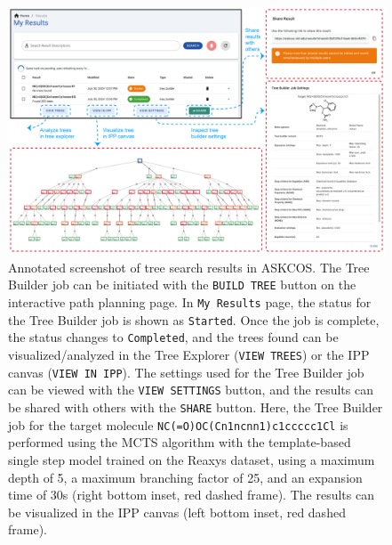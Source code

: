 \documentclass[pdflatex,sn-mathphys-num]{sn-jnl}%
\theoremstyle{thmstyleone}%
\theoremstyle{thmstyletwo}%
\theoremstyle{thmstylethree}%
\begin{document}
\begin{figure}[h!]
\centering
\includegraphics[width=1.0\textwidth]{media/2.TreeResult.png}
\caption{Annotated screenshot of tree search results in ASKCOS. The Tree Builder job can be initiated with the \texttt{BUILD TREE} button on the interactive path planning page. In \texttt{My Results} page, the status for the Tree Builder job is shown as \texttt{Started}. Once the job is complete, the status changes to \texttt{Completed}, and the trees found can be visualized/analyzed in the Tree Explorer (\texttt{VIEW TREES}) or the IPP canvas (\texttt{VIEW IN IPP}). The settings used for the Tree Builder job can be viewed with the \texttt{VIEW SETTINGS} button, and the results can be shared with others with the \texttt{SHARE} button. Here, the Tree Builder job for the target molecule \texttt{NC(=O)OC(Cn1ncnn1)c1ccccc1Cl} is performed using the MCTS algorithm with the template-based single step model trained on the Reaxys dataset, using a maximum depth of 5, a maximum branching factor of 25, and an expansion time of 30s (right bottom inset, red dashed frame). The results can be visualized in the IPP canvas {(left bottom inset, red dashed frame)}.}\label{fig_tree_results}
\end{figure}

\end{document}
